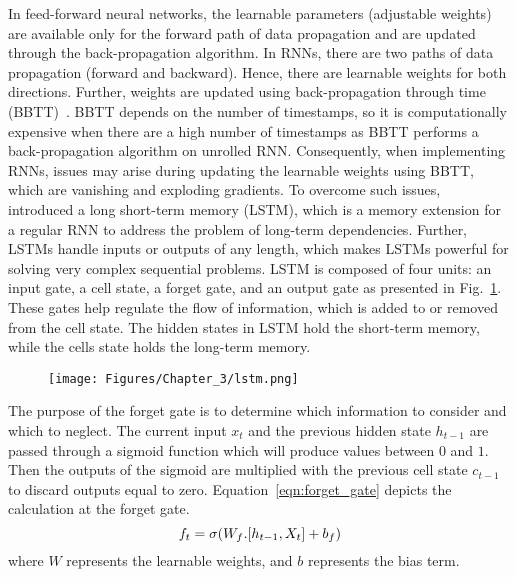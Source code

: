 In feed-forward neural networks, the learnable parameters (adjustable weights) are available only for the forward path of data propagation and are updated through the back-propagation algorithm.
In RNNs, there are two paths of data propagation (forward and backward). 
Hence, there are learnable weights for both directions.
Further, weights are updated using back-propagation through time (BBTT)~\cite{Werbos1990}.
BBTT depends on the number of timestamps, so it is computationally expensive when there are a high number of timestamps as BBTT performs a back-propagation algorithm on unrolled RNN.
Consequently, when implementing RNNs, issues may arise during updating the learnable weights using BBTT, which are vanishing and exploding gradients.
To overcome such issues, ~\textcite{Hochreiter1997} introduced a long short-term memory (LSTM), which is a memory extension for a regular RNN to address the problem of long-term dependencies.
Further, LSTMs handle inputs or outputs of any length, which makes LSTMs powerful for solving very complex sequential problems.
LSTM is composed of four units: an input gate, a cell state, a forget gate, and an output gate as presented in Fig.~\ref{fig:lstm}.
These gates help regulate the flow of information, which is added to or removed from the cell state. 
The hidden states in LSTM hold the short-term memory, while the cells state holds the long-term memory.
\begin{figure}[h!]
	\begin{center}
		\texttt{[image: Figures/Chapter\_3/lstm.png]}
	\end{center}
	\label{fig:lstm}
\end{figure}

The purpose of the forget gate is to determine which information to consider and which to neglect.
The current input \(x_t\) and the previous hidden state \(h_{t-1}\) are passed through a sigmoid function which will produce values between \(0\) and \(1\).
Then the outputs of the sigmoid are multiplied with the previous cell state \(c_{t-1}\) to discard outputs equal to zero.
Equation~\ref{eqn:forget_gate} depicts the calculation at the forget gate.
\begin{equation}
	\centering
	f_t = \sigma(W_f.[h_{t-1}, X_{t}]+ b_f)
	\label{eqn:forget_gate}
\end{equation}
where \(W\) represents the learnable weights, and \(b\) represents the bias term.

